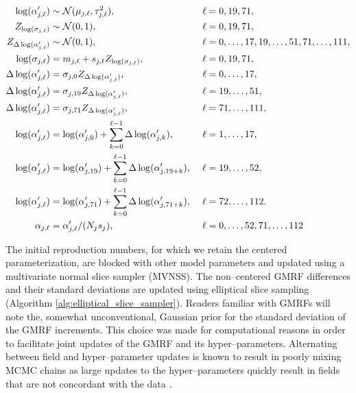 \begin{footnotesize}
	\begin{align}
	\log(\alpha^\prime_{j,\ell}) &\sim \mcN(\mu_{j,\ell},\tau_{j,\ell}^2),&\ &\ell= 0,19,71, \nonumber\\
	Z_{\log(\sigma_{j,\ell})} &\sim \mcN(0,1),&\ &\ell=0,19,71, \nonumber \\
	Z_{\Delta\log(\alpha^\prime_{j,\ell})} &\sim \mcN(0,1),&\ &\ell=0,\dots,17,19,\dots,51,71,\dots,111, \nonumber \\ 
	\log(\sigma_{j,\ell}) &= m_{j,\ell} + s_{j,\ell}Z_{\log(\sigma_{j,\ell})},&\ &\ell = 0,19,71,\nonumber\\
	\Delta\log(\alpha^\prime_{j,\ell})&= \sigma_{j,0} Z_{\Delta\log(\alpha^\prime_{j,\ell})},&\ &\ell=0,\dots,17, \nonumber\\
	\Delta\log(\alpha^\prime_{j,\ell})&= \sigma_{j,19} Z_{\Delta\log(\alpha^\prime_{j,\ell})},&\ &\ell=19,\dots,51, \nonumber\\
	\Delta\log(\alpha^\prime_{j,\ell})&= \sigma_{j,71} Z_{\Delta\log(\alpha^\prime_{j,\ell})},&\ &\ell=71,\dots,111, \nonumber\\
	\log(\alpha^\prime_{j,\ell}) &= \log(\alpha^\prime_{j,0}) + \sum_{k=0}^{\ell-1}\Delta\log(\alpha^\prime_{j,k}),&\ &\ell = 1,\dots,17, \nonumber\\
	\log(\alpha^\prime_{j,\ell}) &= \log(\alpha^\prime_{j,19}) + \sum_{k=0}^{\ell-1}\Delta\log(\alpha^\prime_{j,19+k}),&\ &\ell = 19,\dots,52, \nonumber\\
	\log(\alpha^\prime_{j,\ell}) &= \log(\alpha^\prime_{j,71}) + \sum_{k=0}^{\ell-1}\Delta\log(\alpha^\prime_{j,71+k}),&\ &\ell = 72,\dots,112. \nonumber \\
	\alpha_{j,\ell} &= \alpha^\prime_{j,\ell}/(N_js_j),&\ &\ell=0,\dots,52,71,\dots,112 \nonumber
	\end{align}
\end{footnotesize}
The initial reproduction numbers, for which we retain the centered parameterization, are blocked with other model parameters and updated using a multivariate normal slice sampler (MVNSS). The non--centered GMRF differences and their standard deviations are updated 
using elliptical slice sampling (Algorithm \ref{alg:elliptical_slice_sampler}).
Readers familiar with GMRFs will note the, somewhat unconventional, Gaussian prior for the standard deviation of the GMRF increments. This choice was made for computational reasons in order to facilitate joint updates of the GMRF and its hyper--parameters. Alternating between field and hyper--parameter updates is known to result in poorly mixing MCMC chains as large updates to the hyper--parameters quickly result in fields that are not concordant with the data  \cite{knorr2002block,murray2010hyper}. 

